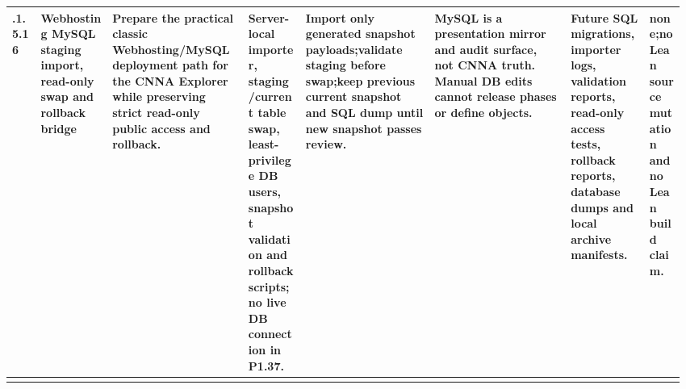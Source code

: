\begin{longtable}{L{0.042\linewidth} L{0.105\linewidth} L{0.195\linewidth} L{0.08\linewidth} L{0.185\linewidth} L{0.19\linewidth} L{0.118\linewidth} L{0.055\linewidth}}
\hline
{}.1.5.16 & Webhosting MySQL staging import, read-only swap and rollback bridge & Prepare the practical classic Webhosting/\allowbreak{}MySQL deployment path for the CNNA Explorer while preserving strict read-only public access and rollback. & Server-local importer, staging/\allowbreak{}current table swap, least-privilege DB users, snapshot validation and rollback scripts;\newline no live DB connection in P1.37. & Import only generated snapshot payloads;\newline validate staging before swap;\newline keep previous current snapshot and SQL dump until new snapshot passes review. & MySQL is a presentation mirror and audit surface, not CNNA truth. Manual DB edits cannot release phases or define objects. & Future SQL migrations, importer logs, validation reports, read-only access tests, rollback reports, database dumps and local archive manifests. & none;\newline no Lean source mutation and no Lean build claim.\\
\hline
\addlinespace[0.24em]
\end{longtable}
\normalsize
